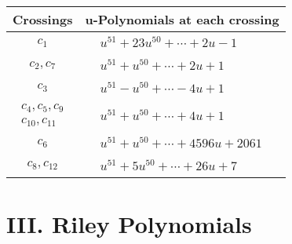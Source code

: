 \documentclass[1p]{elsarticle_modified}
\theoremstyle{definition}
\begin{document}
\begin{tabular}{m{50pt}|m{274pt}}
Crossings & \hspace{64pt}u-Polynomials at each crossing \\
\hline $$\begin{aligned}c_{1}\end{aligned}$$&$\begin{aligned}
&u^{51}+23 u^{50}+\cdots+2 u-1
\end{aligned}$\\
\hline $$\begin{aligned}c_{2},c_{7}\end{aligned}$$&$\begin{aligned}
&u^{51}+u^{50}+\cdots+2 u+1
\end{aligned}$\\
\hline $$\begin{aligned}c_{3}\end{aligned}$$&$\begin{aligned}
&u^{51}- u^{50}+\cdots-4 u+1
\end{aligned}$\\
\hline $$\begin{aligned}c_{4},c_{5},c_{9}\\c_{10},c_{11}\end{aligned}$$&$\begin{aligned}
&u^{51}+u^{50}+\cdots+4 u+1
\end{aligned}$\\
\hline $$\begin{aligned}c_{6}\end{aligned}$$&$\begin{aligned}
&u^{51}+u^{50}+\cdots+4596 u+2061
\end{aligned}$\\
\hline $$\begin{aligned}c_{8},c_{12}\end{aligned}$$&$\begin{aligned}
&u^{51}+5 u^{50}+\cdots+26 u+7
\end{aligned}$\\
\hline
\end{tabular}\newpage\renewcommand{\arraystretch}{1}
\centering \section*{ III. Riley Polynomials}
\end{document}
